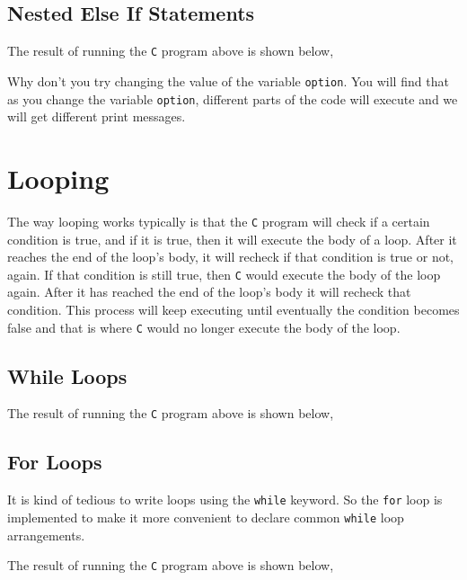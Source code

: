 \documentclass[a4paper, 12pt]{report}
\begin{document}
\begin{center}
\subsection{Nested Else If Statements}
\begin{comment}
\end{comment}

The result of running the \texttt{C} program above is shown below,

Why don't you try changing the value of the variable \texttt{option}. 
You will find that as you change the variable \texttt{option}, different parts of the code will execute and we will get different print messages.

\section{Looping}
\begin{comment}
\end{comment}
The way looping works typically is that the \texttt{C} program will check if a certain condition is true, and if it is true, then it will execute the body of a loop.
After it reaches the end of the loop's body, it will recheck if that condition is true or not, again. 
If that condition is still true, then \texttt{C} would execute the body of the loop again.
After it has reached the end of the loop's body it will recheck that condition. 
This process will keep executing until eventually the condition becomes false and that is where \texttt{C} would no longer execute the body of the loop. 

\subsection{While Loops}
\begin{comment}
\end{comment}

The result of running the \texttt{C} program above is shown below,


\subsection{For Loops}
\begin{comment}
\end{comment}
It is kind of tedious to write loops using the \texttt{while} keyword. 
So the \texttt{for} loop is implemented to make it more convenient to declare common \texttt{while} loop arrangements.

The result of running the \texttt{C} program above is shown below,



\end{center}
\end{document}
